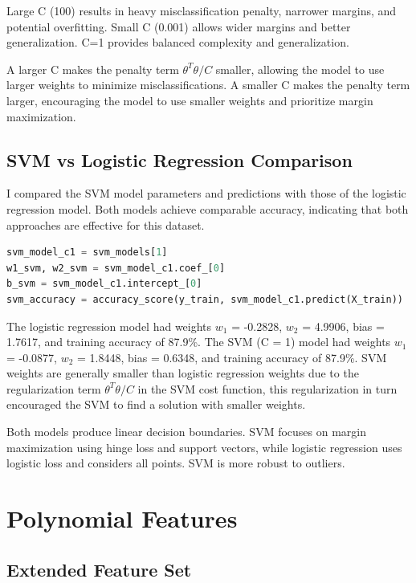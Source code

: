 \documentclass[12pt,a4paper]{article}
\begin{document}
Large C (100) results in heavy misclassification penalty, narrower margins, and potential overfitting. Small C (0.001) allows wider margins and better generalization. C=1 provides balanced complexity and generalization.

A larger C makes the penalty term $\theta^T\theta/C$ smaller, allowing the model to use larger weights to minimize misclassifications. A smaller C makes the penalty term larger, encouraging the model to use smaller weights and prioritize margin maximization.

\subsection{SVM vs Logistic Regression Comparison}

I compared the SVM model parameters and predictions with those of the logistic regression model. Both models achieve comparable accuracy, indicating that both approaches are effective for this dataset.

\begin{lstlisting}[language=Python, caption={SVM vs Logistic Regression comparison}]
svm_model_c1 = svm_models[1]
w1_svm, w2_svm = svm_model_c1.coef_[0]
b_svm = svm_model_c1.intercept_[0]
svm_accuracy = accuracy_score(y_train, svm_model_c1.predict(X_train))
\end{lstlisting}

The logistic regression model had weights $w_1$ = -0.2828, $w_2$ = 4.9906, bias = 1.7617, and training accuracy of 87.9\%. The SVM (C = 1) model had weights $w_1$ = -0.0877, $w_2$ = 1.8448, bias = 0.6348, and training accuracy of 87.9\%. SVM weights are generally smaller than logistic regression weights due to the regularization term $\theta^T\theta/C$ in the SVM cost function, this regularization in turn encouraged the SVM to find a solution with smaller weights.

Both models produce linear decision boundaries. SVM focuses on margin maximization using hinge loss and support vectors, while logistic regression uses logistic loss and considers all points. SVM is more robust to outliers.

\section{Polynomial Features}

\subsection{Extended Feature Set}
\end{document}
